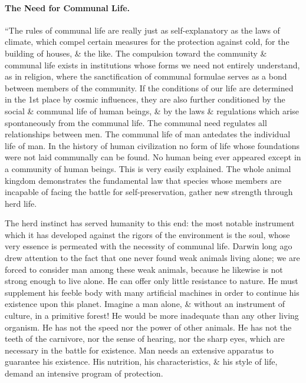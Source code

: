 \documentclass{article}
\begin{document}
\paragraph{The Need for Communal Life.} ``The rules of communal life are really just as self-explanatory as the laws of climate, which compel certain measures for the protection against cold, for the building of houses, \& the like. The compulsion toward the community \& communal life exists in institutions whose forms we need not entirely understand, as in religion, where the sanctification of communal formulae serves as a bond between members of the community. If the conditions of our life are determined in the 1st place by cosmic influences, they are also further conditioned by the social \& communal life of human beings, \& by the laws \& regulations which arise spontaneously from the communal life. The communal need regulates all relationships between men. The communal life of man antedates the individual life of man. In the history of human civilization no form of life whose foundations were not laid communally can be found. No human being ever appeared except in a community of human beings. This is very easily explained. The whole animal kingdom demonstrates the fundamental law that species whose members are incapable of facing the battle for self-preservation, gather new strength through herd life.

The herd instinct has served humanity to this end: the most notable instrument which it has developed against the rigors of the environment is the soul, whose very essence is permeated with the necessity of communal life. Darwin long ago drew attention to the fact that one never found weak animals living alone; we are forced to consider man among these weak animals, because he likewise is not strong enough to live alone. He can offer only little resistance to nature. He must supplement his feeble body with many artificial machines in order to continue his existence upon this planet. Imagine a man alone, \& without an instrument of culture, in a primitive forest! He would be more inadequate than any other living organism. He has not the speed nor the power of other animals. He has not the teeth of the carnivore, nor the sense of hearing, nor the sharp eyes, which are necessary in the battle for existence. Man needs an extensive apparatus to guarantee his existence. His nutrition, his characteristics, \& his style of life, demand an intensive program of protection.
\end{document}
